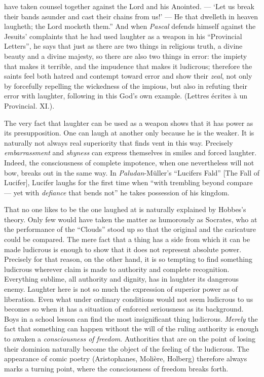 \documentclass[12pt,a4paper]{book}
\newcommand{\opage}[1]{\marginnote{\footnotesize\textit{[#1]}}}
\begin{document}
have taken counsel together against the Lord and his Anointed. ---
`Let us break their bands asunder and cast their
\opage{347}chains from us!' --- He that dwelleth in heaven laugheth; the
Lord mocketh them.'' And when \emph{Pascal} defends himself against the
Jesuits' complaints that he had used laughter as a weapon in his
``Provincial Letters'', he says that just as there are two things in
religious truth, a divine beauty and a divine majesty, so there are also
two things in error: the impiety that makes it terrible, and the
impudence that makes it ludicrous; therefore the saints feel both hatred
and contempt toward error and show their \emph{zeal}, not only by
forcefully repelling the wickedness of the impious, but also in refuting
their error with laughter, following in this God's own example.
(Lettres écrites à un Provincial. XI.).

The very fact that laughter can be used as a weapon shows that it has
power as its presupposition. One can laugh at another only because he
is the weaker. It is naturally not always real superiority that finds
vent in this way. Precisely \emph{embarrassment} and \emph{shyness} can
express themselves in smiles and forced laughter. Indeed, the
consciousness of complete impotence, when one nevertheless will not
bow, breaks out in the same way. In \emph{Paludan}-Müller's ``Lucifers
Fald'' [The Fall of Lucifer], Lucifer laughs for the first time when
``with trembling beyond compare --- yet with \emph{defiance} that bends
not'' he takes possession of his kingdom.

That no one likes to be the one laughed at is naturally explained by
Hobbes's theory. Only few would have taken the matter as humorously as
Socrates, who at the performance of the ``Clouds'' stood up so that the
original and the caricature could be compared. The mere fact that a
thing has a side from which it can be made ludicrous is enough to show
that it does not represent absolute power. Precisely for that reason,
on the other hand, it is so tempting to find something ludicrous
wherever claim is made to authority and complete recognition. Everything
sublime, all authority and dignity, has in laughter its dangerous enemy.
Laughter here is not so much the expression of superior power as of
liberation. Even what under ordinary conditions would not seem ludicrous
to us becomes so when it has a situation of enforced seriousness as its
background. Boys in a school lesson can find the most insignificant
thing ludicrous. \emph{Merely} the fact that something can happen
without the will of the ruling authority
\opage{348}is enough to awaken a \emph{consciousness of freedom}.
Authorities that are on the point of losing their dominion naturally
become the object of the feeling of the ludicrous. The appearance of
comic poetry (Aristophanes, Molière, Holberg) therefore always marks a
turning point, where the consciousness of freedom breaks forth.
\end{document}
